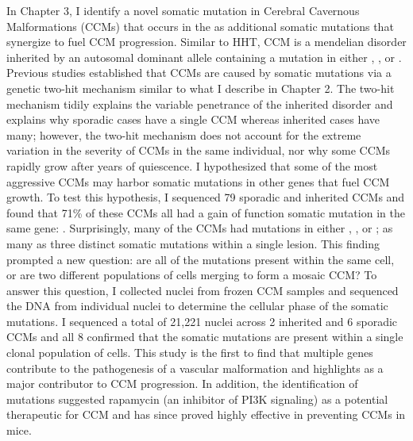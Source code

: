 In Chapter 3, I identify a novel somatic mutation in Cerebral Cavernous Malformations (CCMs) that occurs in the  as additional somatic mutations that synergize to fuel CCM progression. Similar to HHT, CCM is a mendelian disorder inherited by an autosomal dominant allele containing a mutation in either , , or . Previous studies established that CCMs are caused by somatic mutations via a genetic two-hit mechanism similar to what I describe in Chapter 2. The two-hit mechanism tidily explains the variable penetrance of the inherited disorder and explains why sporadic cases have a single CCM whereas inherited cases have many; however, the two-hit mechanism does not account for the extreme variation in the severity of CCMs in the same individual, nor why some CCMs rapidly grow after years of quiescence. I hypothesized that some of the most aggressive CCMs may harbor somatic mutations in other genes that fuel CCM growth. To test this hypothesis, I sequenced 79 sporadic and inherited CCMs and found that 71\% of these CCMs all had a gain of function somatic mutation in the same gene: . Surprisingly, many of the CCMs had mutations in   either , , or ; as many as three distinct somatic mutations within a single lesion. This finding prompted a new question: are all of the mutations present within the same cell, or are two different populations of cells merging to form a mosaic CCM? To answer this question, I collected nuclei from frozen CCM samples and sequenced the DNA from individual nuclei to determine the cellular phase of the somatic mutations. I sequenced a total of 21,221 nuclei across 2 inherited and 6 sporadic CCMs and all 8 confirmed that the somatic mutations are present within a single clonal population of cells. This study is the first to find that multiple genes contribute to the pathogenesis of a vascular malformation and highlights  as a major contributor to CCM progression. In addition, the identification of  mutations suggested rapamycin (an inhibitor of PI3K signaling) as a potential therapeutic for CCM and has since proved highly effective in preventing CCMs in mice. 

